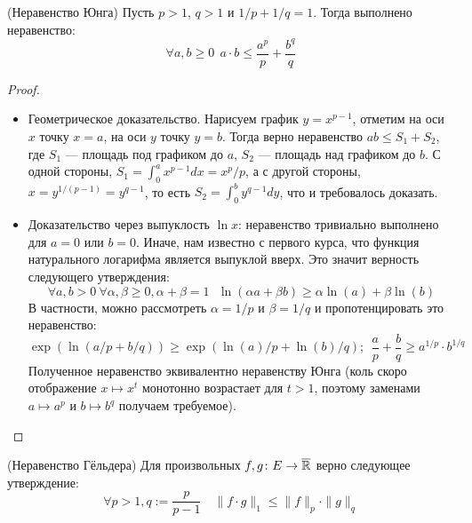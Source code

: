 \begin{proposition} (Неравенство Юнга)
	Пусть $p > 1$, $q > 1$ и $1 / p + 1 / q = 1$. Тогда выполнено неравенство:
	\[
		\forall a, b \ge 0\ \ a \cdot b \le \frac{a^p}{p} + \frac{b^q}{q}
	\]
\end{proposition}

\begin{proof}~
	\begin{itemize}
		\item Геометрическое доказательство. Нарисуем график $y = x^{p - 1}$, отметим на оси $x$ точку $x = a$, на оси $y$ точку $y = b$. Тогда верно неравенство \(ab \le S_1 + S_2\), где $S_1$ --- площадь под графиком до $a$, $S_2$ --- площадь над графиком до $b$. С одной стороны, $S_1 = \int_0^a x^{p - 1}dx = x^p / p$, а с другой стороны, $x = y^{1 / (p - 1)} = y^{q - 1}$, то есть $S_2 = \int_0^b y^{q - 1}dy$, что и требовалось доказать.
		
		\item Доказательство через выпуклость $\ln x$: неравенство тривиально выполнено для $a = 0$ или $b = 0$. Иначе, нам известно с первого курса, что функция натурального логарифма является выпуклой вверх. Это значит верность следующего утверждения:
		\[
			\forall a, b > 0\ \forall \alpha, \beta \ge 0, \alpha + \beta = 1\ \ \ \ln(\alpha a + \beta b) \ge \alpha\ln(a) + \beta\ln(b)
		\]
		В частности, можно рассмотреть $\alpha = 1 / p$ и $\beta = 1 / q$ и пропотенцировать это неравенство:
		\[
			\exp(\ln(a / p + b / q)) \ge \exp(\ln(a) / p + \ln(b) / q);\ \ \frac{a}{p} + \frac{b}{q} \ge a^{1/p} \cdot b^{1/q}
		\]
		Полученное неравенство эквивалентно неравенству Юнга (коль скоро отображение $x \mapsto x^t$ монотонно возрастает для $t > 1$, поэтому заменами $a \mapsto a^p$ и $b \mapsto b^q$ получаем требуемое).
	\end{itemize}
\end{proof}

\begin{theorem} (Неравенство Гёльдера)
	Для произвольных $f, g \colon E \to \overline{\mathbb{R}}$ верно следующее утверждение:
	\[
		\forall p > 1, q := \frac{p}{p - 1} \quad \|f \cdot g\|_1 \le \|f\|_p \cdot \|g\|_q
	\]
\end{theorem}


